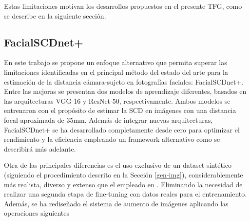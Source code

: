 Estas limitaciones motivan los desarrollos propuestos en el presente TFG, como se describe en la siguiente sección.

\subsection{FacialSCDnet+}

En este trabajo se propone un enfoque alternativo que permita superar las limitaciones identificadas en el principal método del estado del arte para la estimación de la distancia cámara-sujeto en fotografías faciales: FacialSCDnet+. Entre las mejoras se presentan dos modelos de aprendizaje diferentes, basados en las arquitecturas VGG-16 y ResNet-50, respectivamente. Ambos modelos se entrenaron con el propósito de estimar la SCD en imágenes con una distancia focal aproximada de 35mm. Además de integrar nuevas arquitecturas, FacialSCDnet+ se ha desarrollado completamente desde cero para optimizar el rendimiento y la eficiencia empleando un framework alternativo como se describirá más adelante.

Otra de las principales diferencias es el uso exclusivo de un dataset sintético (siguiendo el procedimiento descrito en la Sección \ref{gen-img}), considerablemente más realista, diverso y extenso que el empleado en \cite{14}. Eliminando la necesidad de realizar una segunda etapa de fine-tuning con datos reales para el entrenamiento. Además, se ha rediseñado
el sistema de aumento de imágenes aplicando las operaciones siguientes

